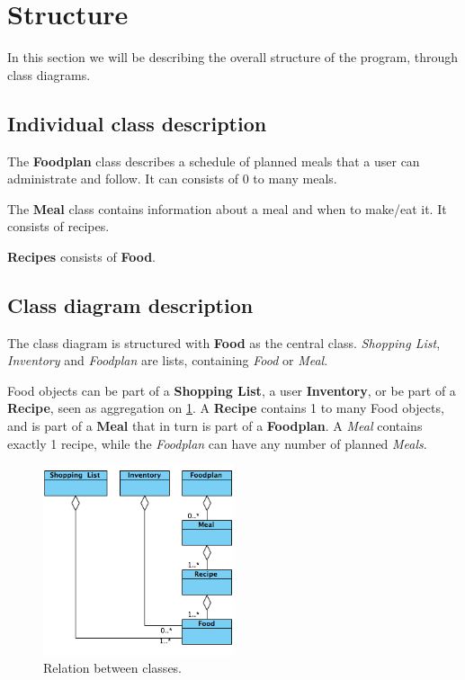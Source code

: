 \section{Structure}
In this section we will be describing the overall structure of the program, through class diagrams.

\subsection{Individual class description}
The \textbf{Foodplan} class describes a schedule of planned meals that a user can administrate and follow.
It can consists of 0 to many meals.

The \textbf{Meal} class contains information about a meal and when to make/eat it. It consists of recipes.

\textbf{Recipes} consists of \textbf{Food}.

\subsection{Class diagram description}
The class diagram is structured with \textbf{Food} as the central class. 
\textit{Shopping List}, \textit{Inventory} and \textit{Foodplan} are lists, containing \textit{Food} or \textit{Meal}.

Food objects can be part of a \textbf{Shopping List}, a user \textbf{Inventory}, or be part of a \textbf{Recipe}, seen as aggregation on \cref{fig:classDiagram}. A \textbf{Recipe} contains 1 to many Food objects, and is part of a \textbf{Meal} that in turn is part of a \textbf{Foodplan}. A \textit{Meal} contains exactly 1 recipe, while the \textit{Foodplan} can have any number of planned \textit{Meals}.

\begin{figure}[H]
	\centering
	\includegraphics[width=0.50\textwidth]{Grafik/FoodPlanner/FoodPlannerClassDiagram.png}
	\caption{Relation between classes.}
	\label{fig:classDiagram}
\end{figure}

